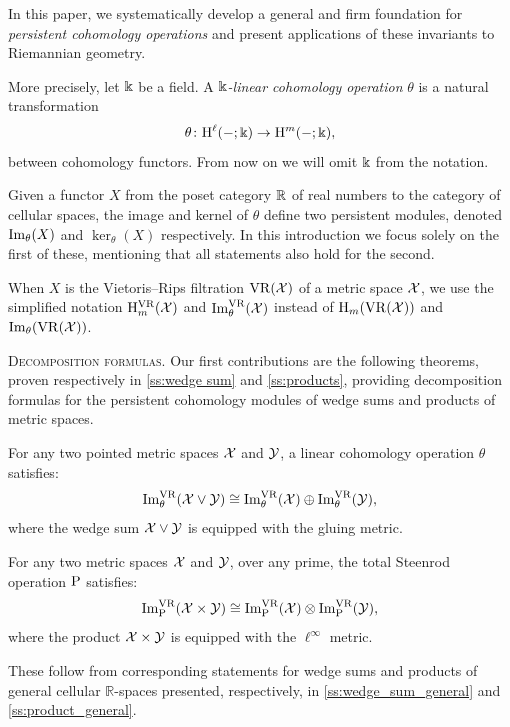 In this paper, we systematically develop a general and firm foundation for \textit{persistent cohomology operations} and present applications of these invariants to Riemannian geometry.

\medskip More precisely, let \(\Bbbk\) be a field.
A \textit{\(\Bbbk\)-linear cohomology operation} \(\theta\) is a natural transformation
\[
\theta \colon \mathrm{H}^\ell(-;\Bbbk) \to \mathrm{H}^m(-;\Bbbk),
\]
between cohomology functors.
From now on we will omit \(\Bbbk\) from the notation.

Given a functor \(X\) from the poset category $\mathbb{R}$ of real numbers to the category of cellular spaces, the image and kernel of \(\theta\) define two persistent modules, denoted \(\operatorname{Im}_\theta(X)\) and \(\ker_\theta(X)\) respectively.
In this introduction we focus solely on the first of these, mentioning that all statements also hold for the second.

When \(X\) is the Vietoris--Rips filtration \(\mathrm{VR}(\mathcal{X})\) of a metric space \(\mathcal{X}\), we use the simplified notation \(\mathrm{H}_m^{\mathrm{VR}}(\mathcal{X})\) and \(\operatorname{Im}_\theta^{\mathrm{VR}}(\mathcal{X})\) instead of \(\mathrm{H}_m(\mathrm{VR}(\mathcal{X}))\) and \(\operatorname{Im}_\theta(\mathrm{VR}(\mathcal{X}))\).

\medskip\noindent\textsc{Decomposition formulas.}
Our first contributions are the following theorems, proven respectively in \cref{ss:wedge sum} and \cref{ss:products}, providing decomposition formulas for the persistent cohomology modules of wedge sums and products of metric spaces.

\begin{introtheorem}\label{thm:decomposition1}
	For any two pointed metric spaces $\mathcal{X}$ and $\mathcal{Y}$, a linear cohomology operation \(\theta\) satisfies:
	\[
	\operatorname{Im}_\theta^{\mathrm{VR}}(\mathcal{X} \vee \mathcal{Y}) \cong \operatorname{Im}_\theta^{\mathrm{VR}}(\mathcal{X}) \oplus \operatorname{Im}_\theta^{\mathrm{VR}}(\mathcal{Y}),
	\]
	where the wedge sum \(\mathcal{X} \vee \mathcal{Y}\) is equipped with the gluing metric.
\end{introtheorem}

\begin{introtheorem}\label{thm:decomposition2}
	For any two metric spaces $\mathcal{X}$ and $\mathcal{Y}$, over any prime, the total Steenrod operation \(\mathrm{P}\) satisfies:
	\[
	\operatorname{Im}^{\mathrm{VR}}_{\mathrm{P}}(\mathcal{X} \times \mathcal{Y}) \cong \operatorname{Im}^{\mathrm{VR}}_{\mathrm{P}}(\mathcal{X}) \otimes \operatorname{Im}^{\mathrm{VR}}_{\mathrm{P}}(\mathcal{Y}),
	\]
	where the product \(\mathcal{X} \times \mathcal{Y}\) is equipped with the \(\ell^\infty\) metric.
\end{introtheorem}

These follow from corresponding statements for wedge sums and products of general cellular $\mathbb{R}$-spaces presented, respectively, in \cref{ss:wedge_sum_general} and \cref{ss:product_general}.

